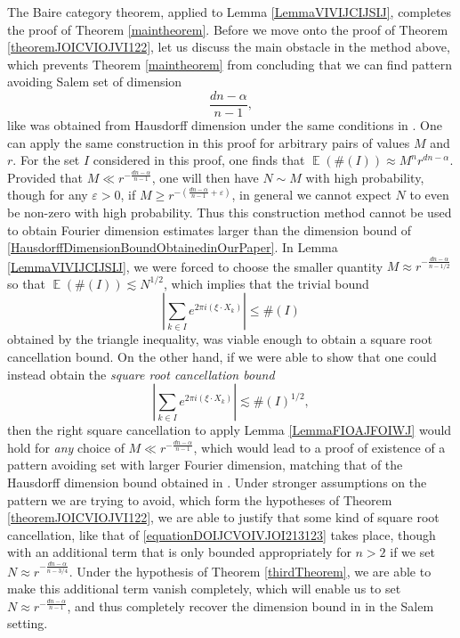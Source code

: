 \documentclass[dvipsnames,letterpaper,12pt]{article}
\numberwithin{equation}{section}
\numberwithin{theorem}{section}
\DeclareMathOperator{\EE}{\mathbb{E}}
\begin{document}
The Baire category theorem, applied to Lemma \ref{LemmaVIVIJCIJSIJ}, completes the proof of Theorem \ref{maintheorem}. Before we move onto the proof of Theorem \ref{theoremJOICVIOJVI122}, let us discuss the main obstacle in the method above, which prevents Theorem \ref{maintheorem} from concluding that we can find pattern avoiding Salem set of dimension
%
\[ \frac{dn - \alpha}{n - 1}, \]
%
like was obtained from Hausdorff dimension under the same conditions in \cite{OurPaper}. One can apply the same construction in this proof for arbitrary pairs of values $M$ and $r$. For the set $I$ considered in this proof, one finds that $\EE(\#(I)) \approx M^n r^{dn - \alpha}$. Provided that $M \ll r^{-\frac{dn-\alpha}{n-1}}$, one will then have $N \sim M$ with high probability, though for any $\varepsilon > 0$, if $M \geq r^{- \left( \frac{dn-\alpha}{n-1} + \varepsilon \right)}$, in general we cannot expect $N$ to even be non-zero with high probability. Thus this construction method cannot be used to obtain Fourier dimension estimates larger than the dimension bound of \eqref{HausdorffDimensionBoundObtainedinOurPaper}. In Lemma \ref{LemmaVIVIJCIJSIJ}, we were forced to choose the smaller quantity $M \approx r^{-\frac{dn - \alpha}{n - 1/2}}$ so that $\EE(\#(I)) \lesssim N^{1/2}$, which implies that the trivial bound
%
\begin{equation}
    \left| \sum_{k \in I} e^{2 \pi i (\xi \cdot X_k)} \right| \leq \#(I)
\end{equation}
%
obtained by the triangle inequality, was viable enough to obtain a square root cancellation bound. On the other hand, if we were able to show that one could instead obtain the \emph{square root cancellation bound}
%
\begin{equation} \label{equationDOIJCVOIVJOI213123}
    \left| \sum_{k \in I} e^{2 \pi i (\xi \cdot X_k)} \right| \lesssim \#(I)^{1/2},
\end{equation}
%
then the right square cancellation to apply Lemma \ref{LemmaFIOAJFOIWJ} would hold for \emph{any} choice of $M \ll r^{-\frac{dn-\alpha}{n-1}}$, which would lead to a proof of existence of a pattern avoiding set with larger Fourier dimension, matching that of the Hausdorff dimension bound obtained in \cite{OurPaper}. Under stronger assumptions on the pattern we are trying to avoid, which form the hypotheses of Theorem \ref{theoremJOICVIOJVI122}, we are able to justify that some kind of square root cancellation, like that of \eqref{equationDOIJCVOIVJOI213123} takes place, though with an additional term that is only bounded appropriately for $n > 2$ if we set $N \approx r^{-\frac{dn-\alpha}{n-3/4}}$. Under the hypothesis of Theorem \ref{thirdTheorem}, we are able to make this additional term vanish completely, which will enable us to set $N \approx r^{-\frac{dn - \alpha}{n - 1}}$, and thus completely recover the dimension bound in \cite{OurPaper} in the Salem setting.
\end{document}
